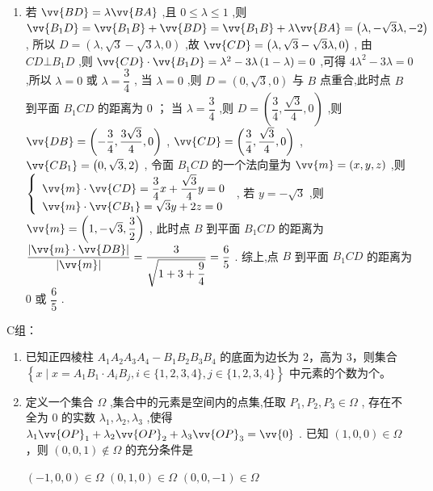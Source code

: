 \begin{enumerate}
\begin{jieda}
\begin{enumerate}
        \item 若 $ \vv{BD} = \lambda \vv{BA} $ ,且 $ 0 \leq  \lambda  \leq  1 $ ,则 $ \vv{{B}_{1}D} = \vv{{B}_{1}B} + \vv{BD} = \vv{{B}_{1}B} + \lambda \vv{BA} = \left( {\lambda , - \sqrt{3}\lambda , - 2}\right) $ ,
所以 $ D = \left( {\lambda ,\sqrt{3} - \sqrt{3}\lambda ,0}\right) $ ,故 $ \vv{CD} = \left( {\lambda ,\sqrt{3} - \sqrt{3}\lambda ,0}\right) $ ,
由 $ {CD} \bot  {B}_{1}D $ ,则 $ \vv{CD} \cdot  \vv{{B}_{1}D} = {\lambda }^{2} - {3\lambda }\left( {1 - \lambda }\right)  = 0 $ ,可得 $ 4{\lambda }^{2} - {3\lambda } = 0 $ ,所以 $ \lambda  = 0 $ 或 $ \lambda  = \dfrac{3}{4} $ ,
当 $ \lambda  = 0 $ ,则 $ D = \left( {0,\sqrt{3},0}\right) $ 与 $ B $ 点重合,此时点 $ B $ 到平面 $ {B}_{1}{CD} $ 的距离为 0 ；
当 $ \lambda  = \dfrac{3}{4} $ ,则 $ D = \left( {\dfrac{3}{4},\dfrac{\sqrt{3}}{4},0}\right) $ ,则 $ \vv{DB} = \left( {-\dfrac{3}{4},\dfrac{3\sqrt{3}}{4},0}\right) $ , $ \vv{CD} = \left( {\dfrac{3}{4},\dfrac{\sqrt{3}}{4},0}\right) $ , $ \vv{C{B}_{1}} = \left( {0,\sqrt{3},2}\right) $ ,
令面 $ {B}_{1}{CD} $ 的一个法向量为 $ \vv{m} = \left( {x,y,z}\right) $ ,则 $ \left\{  \begin{array}{l} \vv{m} \cdot  \vv{CD} = \dfrac{3}{4}x + \dfrac{\sqrt{3}}{4}y = 0 \\  \vv{m} \cdot  \vv{C{B}_{1}} = \sqrt{3}y + {2z} = 0 \end{array}\right. $ ,
若 $ y =  - \sqrt{3} $ ,则 $ \vv{m} = \left( {1, - \sqrt{3},\dfrac{3}{2}}\right) $ ,
此时点 $ B $ 到平面 $ {B}_{1}{CD} $ 的距离为 $ \dfrac{\left| \vv{m} \cdot  \vv{DB}\right| }{\left| \vv{m}\right| } = \dfrac{3}{\sqrt{1 + 3 + \dfrac{9}{4}}} = \dfrac{6}{5} $ .
综上,点 $ B $ 到平面 $ {B}_{1}{CD} $ 的距离为 0 或 $ \dfrac{6}{5} $ .
    \end{enumerate}
\end{jieda}

\end{enumerate}


C组：
\begin{enumerate}
    \item 已知正四棱柱 ${{A}}_{1}{{A}}_{2}{{A}}_{3}{{A}}_{4} - {{B}}_{1}{{B}}_{2}{{B}}_{3}{{B}}_{4}$ 的底面为边长为 2，高为 3，则集合 $\left\{  {{x} \mid  {x} = {{A}}_{1}{{B}}_{1} \cdot  {{A}}_{i}{{B}}_{j},{i} \in  \{ 1,2,3,4\} ,{j} \in  \{ 1,2,3,4\} }\right\}$ 中元素的个数为个。


    \item 定义一个集合 ${\Omega }$ ,集合中的元素是空间内的点集,任取 ${{P}}_{1},{{P}}_{2},{{P}}_{3} \in  \Omega$ , 存在不全为 0 的实数 ${\lambda }_{1},{\lambda }_{2},{\lambda }_{3}$ ,使得 ${\lambda }_{1}{\vv{OP}}_{1} + {\lambda }_{2}{\vv{OP}}_{2} + {\lambda }_{3}{\vv{OP}}_{3} = \vv{0}$ . 已知 $\left( {{1},{0},{0}}\right)  \in  \Omega$ ，则 $\left( {{0},{0},{1}}\right)  \notin  \Omega$ 的充分条件是

    {$\left( {-{1},{0},{0}}\right)  \in  {\Omega }$}
    {$\left( {{0},{1},{0}}\right)  \in  {\Omega }$}   
    {$\left( {{0},{0}, - {1}}\right)  \in  {\Omega }$}
    
\end{enumerate}
